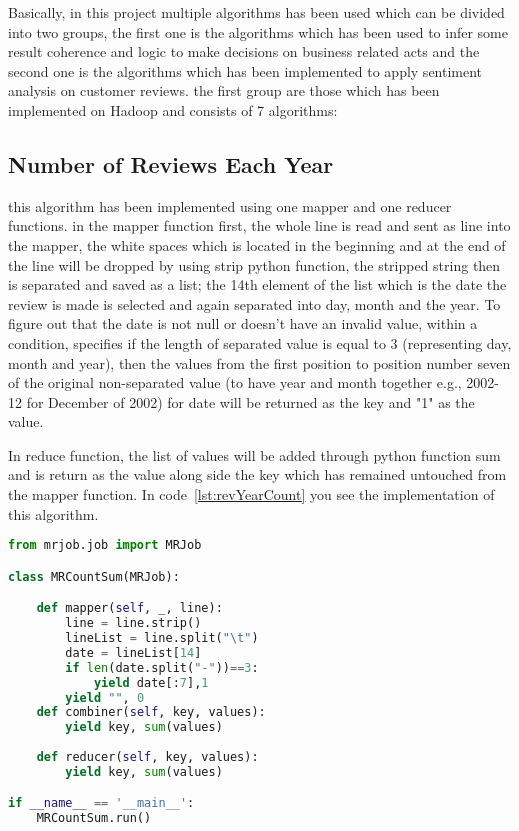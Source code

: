 Basically, in this project multiple algorithms has been used which can be divided into two groups, the first one is the algorithms which has been used to infer some result coherence and logic to make decisions on business related acts and the second one is the algorithms which has been implemented to apply sentiment analysis on customer reviews. the first group are those which has been implemented on Hadoop and consists of 7 algorithms:
\subsection{Number of Reviews Each Year} this algorithm has been implemented using one mapper and one reducer functions. in the mapper function first, the whole line is read and sent as line into the mapper, the white spaces which is located in the beginning and at the end of the line will be dropped by using strip  python function, the stripped string then is separated and saved as a list; the 14th element of the list which is the date the review is made is selected and again separated into day, month and the year. To figure out that the date is not null or doesn't have an invalid value, within a condition, specifies if the length of separated value is equal to 3 (representing day, month and year), then the values from the first position to position number seven of the original non-separated value (to have year and month together e.g., 2002-12 for December of 2002) for date will be returned as the key and "1" as the value.

In reduce function, the list of values will be added through python function sum and is return as the value along side the key which has remained untouched from the mapper function. In code~\ref{lst:revYearCount} you see the implementation of this algorithm.




\renewcommand{\lstlistingname}{Code}
\lstset{style=mystyle}
\begin{lstlisting}[language=Python, caption={Number of Reviews Each Year}, label={lst:revYearCount}, mathescape = true, breaklines=true]
from mrjob.job import MRJob

class MRCountSum(MRJob):

    def mapper(self, _, line):
        line = line.strip()  
        lineList = line.split("\t")
        date = lineList[14]
        if len(date.split("-"))==3:
            yield date[:7],1
        yield "", 0
    def combiner(self, key, values):
        yield key, sum(values)
        
    def reducer(self, key, values):
        yield key, sum(values)

if __name__ == '__main__':
    MRCountSum.run()
\end{lstlisting}

